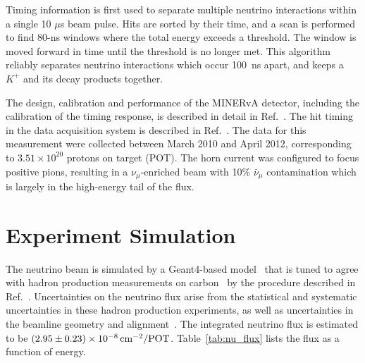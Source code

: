 \documentclass[aps,prl,preprint,showpacs,superscriptaddress,nofootinbib,floatfix,linenumbers]{revtex4}
\newcommand{\minerva}{MINERvA\xspace}
\newcommand{\numu}{\ensuremath{\nu_{\mu}}\xspace}
\newcommand{\numubar}{\ensuremath{\bar{\nu}_{\mu}}\xspace}
\newcommand{\kp}{\ensuremath{K^{+}}\xspace}
\begin{document}
Timing information is first used to separate multiple neutrino interactions within a single 10 $\mu$s beam pulse. Hits are sorted by their time, and a scan is performed to find 80-ns windows where the total energy exceeds a threshold. The window is moved forward in time until the threshold is no longer met. This algorithm reliably separates neutrino interactions which occur 100~ns apart, and keeps a \kp and its decay products together. 

The design, calibration and performance of the \minerva detector, including the calibration of the timing response, is described in detail in Ref.~\cite{minerva_nim}. The hit timing in the data acquisition system is described in Ref.~\cite{daq_nim}. The data for this measurement were collected between March 2010 and April 2012, corresponding to $3.51\times 10^{20}$ protons on target (POT). The horn current was configured to focus positive pions, resulting in a \numu-enriched beam with 10\% \numubar contamination which is largely in the high-energy tail of the flux.

\section{Experiment Simulation}
\label{sec:expt_sim}
The neutrino beam is simulated by a Geant4-based model~\cite{geant4a, geant4b} that is tuned to agree with hadron production measurements on carbon~\cite{na49, na49b} by the procedure described in Ref.~\cite{MINERvAflux,leothesis}. Uncertainties on the neutrino flux arise from the statistical and systematic uncertainties in these hadron production experiments, as well as uncertainties in the beamline geometry and alignment~\cite{zarko}. The integrated neutrino flux is estimated to be $\unit[(2.95 \pm 0.23) \times 10^{-8}]{cm^{-2}/POT}$. Table~\ref{tab:nu_flux} lists the flux as a function of energy.
\end{document}

